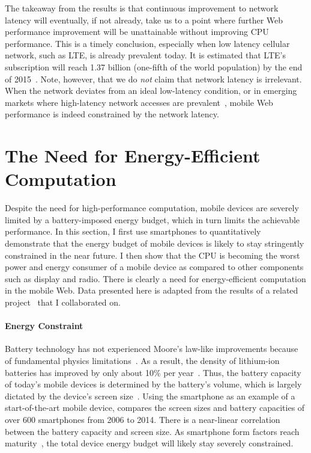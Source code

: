 The takeaway from the results is that continuous improvement to network latency will eventually, if not already, take us to a point where further Web performance improvement will be unattainable without improving CPU performance.  This is a timely conclusion, especially when low latency cellular network, such as LTE, is already prevalent today. It is estimated that LTE's subscription will reach 1.37 billion (one-fifth of the world population) by the end of 2015~\cite{lte_subscription}. Note, however, that we do \emph{not} claim that network latency is irrelevant. When the network deviates from an ideal low-latency condition, or in emerging markets where high-latency network accesses are prevalent~\cite{em}, mobile Web performance is indeed constrained by the network latency.

\section{The Need for Energy-Efficient Computation}
\label{sec:motivation:energy}

Despite the need for high-performance computation, mobile devices are severely limited by a battery-imposed energy budget, which in turn limits the achievable performance. In this section, I first use smartphones to quantitatively demonstrate that the energy budget of mobile devices is likely to stay stringently constrained in the near future. I then show that the CPU is becoming the worst power and energy consumer of a mobile device as compared to other components such as display and radio. There is clearly a need for energy-efficient computation in the mobile Web. Data presented here is adapted from the results of a related project~\cite{mobilecpu} that I collaborated on.

\paragraph{Energy Constraint} Battery technology has not experienced Moore's law-like improvements because of fundamental physics limitations~\cite{battery-mooreslaw}. As a result, the density of lithium-ion batteries has improved by only about 10\% per year~\cite{battery-stats}. Thus, the battery capacity of today's mobile devices is determined by the battery's volume, which is largely dictated by the device's screen size~\cite{phonescreen}. Using the smartphone as an example of a start-of-the-art mobile device,  compares the screen sizes and battery capacities of over 600 smartphones from 2006 to 2014. There is a near-linear correlation between the battery capacity and screen size. As smartphone form factors reach maturity~\cite{phonesize}, the total device energy budget will likely stay severely constrained.

